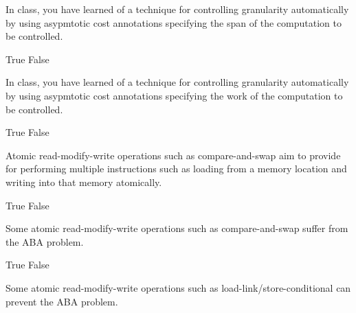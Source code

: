\begin{cluster}
\begin{parts}
\begin{problem}[2]
In class, you have learned of a technique for controlling granularity
automatically by using asypmtotic cost annotations specifying the span
of the  computation to be controlled.


\begin{pickone}
\correctchoice True
\choice False
\end{pickone}

\end{problem}

\begin{problem}[2]

In class, you have learned of a technique for controlling granularity
automatically by using asypmtotic cost annotations specifying the work
of the  computation to be controlled.

\begin{pickone}
\choice True
\correctchoice False
\end{pickone}

\end{problem}

\begin{problem}[2]

Atomic read-modify-write operations such as compare-and-swap aim to
provide for performing multiple instructions such as loading from a
memory location and writing into that memory atomically.

\begin{pickone}
\correctchoice True
\choice False
\end{pickone}


\end{problem} 


\begin{problem}[2]

Some atomic read-modify-write operations such as compare-and-swap
suffer from the ABA problem.

\begin{pickone}
\correctchoice True
\choice False
\end{pickone}


\end{problem} 

\begin{problem}[2]

Some atomic read-modify-write operations such as
load-link/store-conditional can prevent the ABA problem.


\end{problem}
\end{parts}
\end{cluster}
